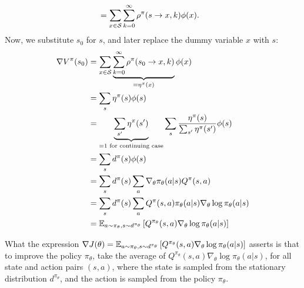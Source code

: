 \documentclass{article}
\begin{document}
\begin{tcolorbox}[breakable,enhanced,colback=gray!10!white,colframe=gray!50!black,
title={Policy Gradient Derivation for $J(\theta) = V^{\pi_\theta}(s_0)$}]
\begin{align*}
    &=\sum_{x\in{\mathcal S}} \sum_{k=0}^\infty \rho^\pi(s\to x, k)\phi(x).
\end{align*}
Now, we substitute $s_0$ for $s$, and later replace the dummy variable $x$ with $s$:
\begin{align*}
    \nabla V^{\pi}(s_0) &=\sum_{x\in{\mathcal S}}\underbrace{\sum_{k=0}^\infty \rho^\pi(s_0\to x, k)}_{=\eta^\pi(x)}\phi(x) \\
    &= \sum_{s}\eta^\pi(s)\phi(s)\\
    &=\underbrace{\sum_{s^\prime}\eta^\pi(s^\prime)}_{=1 \text{ for continuing case}} \sum_{s}\frac{\eta^\pi(s)}{\sum_{s^\prime}\eta^\pi(s^\prime)}\phi(s)\\
    &=\sum_{s}d^\pi(s)\phi(s)\\
    &=\sum_{s}d^\pi(s)\sum_a \nabla_\theta\pi_\theta(a|s) Q^\pi(s,a)\\
    &=\sum_{s}d^\pi(s)\sum_a  Q^\pi(s,a)\pi_\theta(a|s)\nabla_\theta\log\pi_\theta(a|s)\\
    &={\mathbb E}_{a \sim\pi_\theta, s\sim d^{\pi_\theta}} \left[Q^{\pi_\theta}(s,a)\nabla_\theta\log\pi_\theta(a|s)\right]\\
\end{align*}
\end{tcolorbox}

What the expression $\nabla J(\theta) = {\mathbb E}_{a \sim\pi_\theta, s\sim d^{\pi_\theta}} \left[Q^{\pi_\theta}(s,a)\nabla_\theta\log\pi_\theta(a|s)\right]$ asserts is that to improve the policy $\pi_\theta$, take the average of $Q^{\pi_\theta}(s,a)\nabla_\theta\log\pi_\theta(a|s)$, for all state and action pairs $(s, a)$, where the state is sampled from the stationary distribution $d^{\pi_\theta}$, and the action is sampled from the policy $\pi_\theta$.
\end{document}
